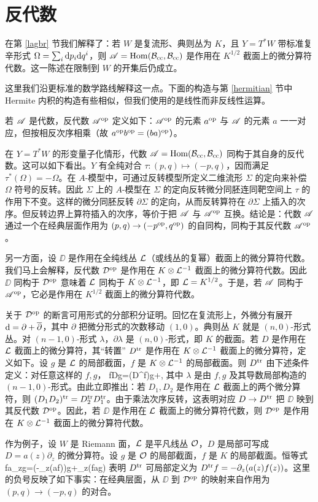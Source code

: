 \section{反代数}\label{opposite}

在第 \ref{lagbr} 节我们解释了：若 $W$ 是复流形、典则丛为 $K$，且 $Y=T^*W$ 带标准复辛形式 $\Omega=\sum_i{\mathrm d} p_i{\mathrm d} q^i$，则 ${\mathscr A}={\mathrm{Hom}}({\mathcal B}_{\mathrm{cc}},{\mathcal B}_{\mathrm{cc}})$ 是作用在 $K^{1/2}$ 截面上的微分算符代数。这一陈述在限制到 $W$ 的开集后仍成立。

这里我们沿更标准的数学路线解释这一点。下面的构造与第 \ref{hermitian} 节中 Hermite 内积的构造有些相似，但我们使用的是线性而非反线性运算。

若 ${\mathscr A}$ 是代数，反代数 ${\mathscr A}^{\mathrm{op}}$ 定义如下：${\mathscr A}^{\mathrm{op}}$ 的元素 $a^{\mathrm{op}}$ 与 ${\mathscr A}$ 的元素 $a$ 一一对应，但按相反次序相乘（故 $a^{\mathrm{op}} b^{\mathrm{op}}=(ba)^{\mathrm{op}}$）。

在 $Y=T^*W$ 的形变量子化情形，代数 ${\mathscr A}={\mathrm{Hom}}({\mathcal B}_{\mathrm{cc}},{\mathcal B}_{\mathrm{cc}})$ 同构于其自身的反代数。这可以如下看出。$Y$ 有全纯对合 $\tau:(p,q)\mapsto(-p,q)$，因而满足 $\tau^*(\Omega)=-\Omega$。在 $A$-模型中，可通过反转模型所定义二维流形 $\Sigma$ 的定向来补偿 $\Omega$ 符号的反转。因此 $\Sigma$ 上的 $A$-模型在 $\Sigma$ 的定向反转微分同胚连同靶空间上 $\tau$ 的作用下不变。这样的微分同胚反转 $\partial\Sigma$ 的定向，从而反转算符在 $\partial\Sigma$ 上插入的次序。但反转边界上算符插入的次序，等价于把 ${\mathscr A}$ 与 ${\mathscr A}^{\mathrm{op}}$ 互换。结论是：代数 ${\mathscr A}$ 通过一个在经典层面作用为 $(p,q)\to(-p^{\mathrm{op}},q^{\mathrm{op}})$ 的自同构，同构于其反代数 ${\mathscr A}^{\mathrm{op}}$。

另一方面，设 $\DD$ 是作用在全纯线丛 ${\mathcal L}$（或线丛的复幂）截面上的微分算符代数。我们马上会解释，反代数 ${\mathcal D}^{\mathrm{op}}$ 是作用在 $K\otimes{\mathcal L}^{-1}$ 截面上的微分算符代数。因此 $\DD$ 同构于 ${\mathcal D}^{\mathrm{op}}$ 意味着 ${\mathcal L}$ 同构于 $K\otimes{\mathcal L}^{-1}$，即 ${\mathcal L}=K^{1/2}$。于是，若 ${\mathscr A}$ 同构于 ${\mathscr A}^{\mathrm{op}}$，它必是作用在 $K^{1/2}$ 截面上的微分算符代数。

关于 ${\mathcal D}^{\mathrm{op}}$ 的断言可用形式的分部积分证明。回忆在复流形上，外微分有展开 ${\mathrm d}=\partial+\overline\partial$，其中 $\partial$ 把微分形式的次数移动 $(1,0)$。典则丛 $K$ 就是 $(n,0)$-形式丛。对 $(n-1,0)$-形式 $\lambda$，$\partial\lambda$ 是 $(n,0)$-形式，即 $K$ 的截面。若 $D$ 是作用在 ${\mathcal L}$ 截面上的微分算符，其“转置” $D^{\mathrm{tr}}$ 是作用在 $K\otimes{\mathcal L}^{-1}$ 截面上的微分算符，定义如下。设 $g$ 是 ${\mathcal L}$ 的局部截面，$f$ 是 $K\otimes{\mathcal L}^{-1}$ 的局部截面。则 $D^{\mathrm{tr}}$ 由下述条件定义：对任意这样的 $f,g$，
\be\label{kilox}fDg=(D^\tr f)g+\partial\lambda,\ee
其中 $\lambda$ 是由 $f,g$ 及其导数局部构造的 $(n-1,0)$-形式。由此立即推出：若 $D_1,D_2$ 是作用在 ${\mathcal L}$ 截面上的两个微分算符，则 $(D_1D_2)^{\mathrm{tr}}=D_2^{\mathrm{tr}} D_1^{\mathrm{tr}}$。由于乘法次序反转，这表明对应 $D\to D^{\mathrm{tr}}$ 把 $\DD$ 映到其反代数 ${\mathcal D}^{\mathrm{op}}$。因此，若 $\DD$ 是作用在 ${\mathcal L}$ 截面上的微分算符代数，则 ${\mathcal D}^{\mathrm{op}}$ 是作用在 $K\otimes{\mathcal L}^{-1}$ 截面上的微分算符代数。

作为例子，设 $W$ 是 Riemann 面，${\mathcal L}$ 是平凡线丛 ${\mathcal O}$，$D$ 是局部可写成 $D=a(z)\partial_z$ 的微分算符。设 $g$ 是 ${\mathcal O}$ 的局部截面，$f$ 是 $K$ 的局部截面。恒等式
\be\label{zor}fa\partial_zg=\left(-\partial_z(af)\right)g+\partial_z(fag)\ee
表明 $D^{\mathrm{tr}}$ 可局部定义为 $D^{\mathrm{tr}} f=-\partial_z(a(z)f(z))$。这里的负号反映了如下事实：在经典层面，从 $\DD$ 到 ${\mathcal D}^{\mathrm{op}}$ 的映射来自作用为 $(p,q)\to(-p,q)$ 的对合。
